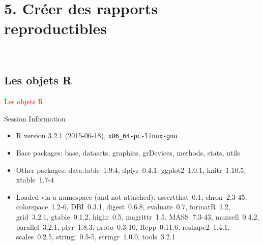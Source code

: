 \documentclass[11pt]{beamer}\usepackage[]{graphicx}\usepackage[]{color}
\begin{document}
\section{5. Cr\'{e}er des rapports reproductibles}

\begin{frame}[plain]
\hspace*{-1.0cm}\parbox[t]{\textwidth}{
 \begin{center}
  \Huge{\textcolor{white}{5. Cr\'{e}er des rapports}}
 \end{center}
 }
\end{frame}

\subsection{Les objets R}

\begin{frame}
 \begin{center}
  \Huge{\textcolor{red}{Les objets R}}
 \end{center}
\end{frame}


\begin{frame}[fragile]{Session Information}
\begin{itemize}\raggedright
  \item R version 3.2.1 (2015-06-18), \verb|x86_64-pc-linux-gnu|
  \item Base packages: base, datasets, graphics, grDevices, methods,
    stats, utils
  \item Other packages: data.table~1.9.4, dplyr~0.4.1, ggplot2~1.0.1,
    knitr~1.10.5, xtable~1.7-4
  \item Loaded via a namespace (and not attached): assertthat~0.1,
    chron~2.3-45, colorspace~1.2-6, DBI~0.3.1, digest~0.6.8,
    evaluate~0.7, formatR~1.2, grid~3.2.1, gtable~0.1.2, highr~0.5,
    magrittr~1.5, MASS~7.3-43, munsell~0.4.2, parallel~3.2.1,
    plyr~1.8.3, proto~0.3-10, Rcpp~0.11.6, reshape2~1.4.1,
    scales~0.2.5, stringi~0.5-5, stringr~1.0.0, tools~3.2.1
\end{itemize}


\end{frame}
\end{document}
